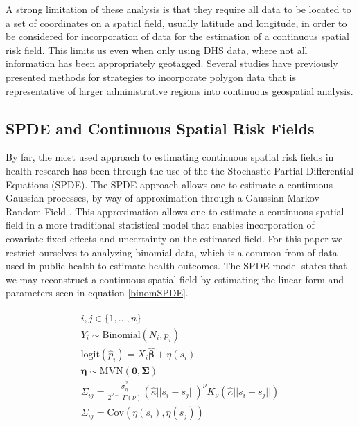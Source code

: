\documentclass{article}
\begin{document}
A strong limitation of these analysis is that they require all data to be located to a set of coordinates on a spatial field, usually latitude and longitude, in order to be considered for incorporation of data for the estimation of a continuous spatial risk field. This limits us even when only using DHS data, where not all information has been appropriately geotagged. Several studies have previously presented methods for strategies to incorporate polygon data that is representative of larger administrative regions into continuous geospatial analysis.

\subsection{SPDE and Continuous Spatial Risk Fields}

By far, the most used approach to estimating continuous spatial risk fields in health research has been through the use of the the Stochastic Partial Differential Equations (SPDE). The SPDE approach allows one to estimate a continuous Gaussian processes, by way of approximation through a Gaussian Markov Random Field \cite{Lindgren2011}. This approximation allows one to estimate a continuous spatial field in a more traditional statistical model that enables incorporation of covariate fixed effects and uncertainty on the estimated field. For this paper we restrict ourselves to analyzing binomial data, which is a common from of data used in public health to estimate health outcomes. The SPDE model states that we may reconstruct a continuous spatial field by estimating the linear form and parameters seen in equation \ref{binomSPDE}.

\begin{align}\label{binomSPDE}\begin{split}
    i,j \in \{1, \dots, n\}\\
    Y_i \sim \text{Binomial}(N_i, \hat{p}_i) \\
    \text{logit}(\hat{p}_i) = X_i \hat{\boldsymbol{\beta}} + \eta(s_i)  \\
    \boldsymbol{\eta} \sim \text{MVN}(\boldsymbol{0}, \boldsymbol{\Sigma}) \\
    \Sigma_{ij} = \frac{\hat{\sigma}^2_\eta}{2^{\nu-1} \Gamma(\nu)}
        (\hat{\kappa} ||s_i - s_j||)^\nu K_\nu(\hat{\kappa} ||s_i - s_j||) \\
    \Sigma_{ij} = \text{Cov}(\eta(s_i) , \eta(s_j))
\end{split}\end{align}
\end{document}
